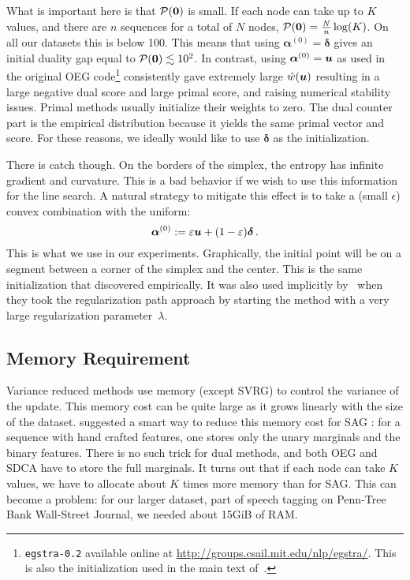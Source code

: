 \begin{subappendices}
	What is important here is that ${\mathcal P}(\bm{0})$ is small.
	If each node can take up to $K$ values, and there are $n$ sequences for a total of $N$ nodes, ${\mathcal P}(\bm{0}) = \frac{N}{n}\log(K)$.
	On all our datasets this is below 100.
	This means that using $\bm{\alpha}^{(0)}=\bm\delta$ gives an initial duality gap equal to ${\mathcal P}(\bm{0})\lesssim10^2$.
	In contrast, using $\bm{\alpha}^{(0)} = \bm u$ as used in the original OEG code\footnote{\texttt{egstra-0.2} available online at \url{http://groups.csail.mit.edu/nlp/egstra/}. This is also the initialization used in the main text of~\citet{schmidt2015non}.} consistently gave extremely large $\hat w(\bm u)$ resulting in a large negative dual score and large primal score, and raising numerical stability issues.
	Primal methods usually initialize their weights to zero.
	The dual counter part is the empirical distribution because it yields the same primal vector and score.
	For these reasons, we ideally would like to use $\bm\delta$ as the initialization.
	
	There is catch though. On the borders of the simplex, the entropy has infinite gradient and curvature.
	This is a bad behavior if we wish to use this information for the line search.
	A natural strategy to mitigate this effect is to take a (small $\epsilon$) convex combination with the uniform:
	\begin{equation} \label{eq:initialization:app}
		\boldsymbol{\alpha}^{(0)} := \varepsilon \bm u + (1-\varepsilon) \bm\delta \, .
	\end{equation}
	This is what we use in our experiments.
	Graphically, the initial point will be on a segment between a corner of the simplex and the center.
	This is the same initialization that \citet[App.~D of the Sup.~Mat.]{schmidt2015non} discovered empirically. It was also used implicitly by~\citet{collins2008exponentiated} when they took the regularization path approach by starting the method with a very large regularization parameter~$\lambda$.
	
	\subsection{Memory Requirement}
	
	Variance reduced methods use memory (except SVRG) to control the variance of the update.
	This memory cost can be quite large as it grows linearly with the size of the dataset.
	\citet{schmidt2015non} suggested a smart way to reduce this memory cost for  SAG : for a sequence with hand crafted features, one stores only the unary marginals and the binary features.
	There is no such trick for dual methods, and both OEG and SDCA have to store the full marginals.
	It turns out that if each node can take $K$ values, we have to allocate about $K$ times more memory than for SAG.
	This can become a problem: for our larger dataset, part of speech tagging on Penn-Tree Bank Wall-Street Journal, we needed about 15GiB of RAM.
	

\end{subappendices}
